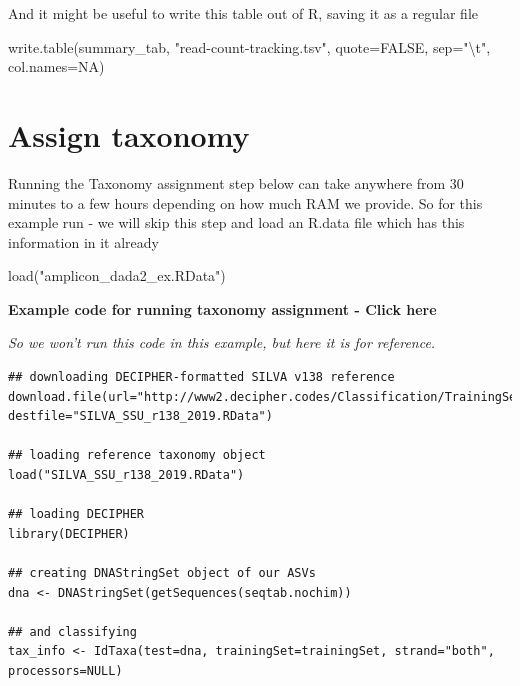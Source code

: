 \documentclass[
]{book}
\makeatletter
\newenvironment{Shaded}{\begin{snugshade}}{\end{snugshade}}
\newcommand{\AttributeTok}[1]{\textcolor[rgb]{0.77,0.63,0.00}{#1}}
\newcommand{\ConstantTok}[1]{\textcolor[rgb]{0.00,0.00,0.00}{#1}}
\newcommand{\FunctionTok}[1]{\textcolor[rgb]{0.00,0.00,0.00}{#1}}
\newcommand{\NormalTok}[1]{#1}
\newcommand{\SpecialCharTok}[1]{\textcolor[rgb]{0.00,0.00,0.00}{#1}}
\newcommand{\StringTok}[1]{\textcolor[rgb]{0.31,0.60,0.02}{#1}}
\newenvironment{kframe}{%
\medskip{}
\setlength{\fboxsep}{.8em}
 \def\at@end@of@kframe{}%
 \ifinner\ifhmode%
  \def\at@end@of@kframe{\end{minipage}}%
  \begin{minipage}{\columnwidth}%
 \fi\fi%
 \def\FrameCommand##1{\hskip\@totalleftmargin \hskip-\fboxsep
 \colorbox{shadecolor}{##1}\hskip-\fboxsep
     \hskip-\linewidth \hskip-\@totalleftmargin \hskip\columnwidth}%
 \MakeFramed {\advance\hsize-\width
   \@totalleftmargin\z@ \linewidth\hsize
   \@setminipage}}%
 {\par\unskip\endMakeFramed%
 \at@end@of@kframe}
\newenvironment{block}[1]
  {
  \begin{itemize}
  \renewcommand{\labelitemi}{
    \raisebox{-.7\height}[0pt][0pt]{
      {\setkeys{Gin}{width=3em,keepaspectratio}\texttt{[image: images/\#1]}}
    }
  }
  \setlength{\fboxsep}{1em}
  \begin{kframe}
  \item
  }
  {
  \end{kframe}
  \end{itemize}
  }
\newenvironment{rmdwarning}
  {\begin{block}{warning}}
  {\end{block}}
\makeatother
\begin{document}
And it might be useful to write this table out of R, saving it as a regular file

\begin{Shaded}
\begin{Highlighting}[]
\FunctionTok{write.table}\NormalTok{(summary\_tab, }\StringTok{"read{-}count{-}tracking.tsv"}\NormalTok{, }\AttributeTok{quote=}\ConstantTok{FALSE}\NormalTok{, }\AttributeTok{sep=}\StringTok{"}\SpecialCharTok{\textbackslash{}t}\StringTok{"}\NormalTok{, }\AttributeTok{col.names=}\ConstantTok{NA}\NormalTok{)}
\end{Highlighting}
\end{Shaded}

\hypertarget{assign-taxonomy}{%
\section{Assign taxonomy}\label{assign-taxonomy}}

\begin{rmdwarning}
Running the Taxonomy assignment step below can take anywhere from 30
minutes to a few hours depending on how much RAM we provide. So for this
example run - we will skip this step and load an R.data file which has
this information in it already
\end{rmdwarning}

\begin{Shaded}
\begin{Highlighting}[]
\FunctionTok{load}\NormalTok{(}\StringTok{"amplicon\_dada2\_ex.RData"}\NormalTok{)}
\end{Highlighting}
\end{Shaded}

\textbf{Example code for running taxonomy assignment - Click here}

\emph{So we won't run this code in this example, but here it is for reference.}

\begin{verbatim}
## downloading DECIPHER-formatted SILVA v138 reference
download.file(url="http://www2.decipher.codes/Classification/TrainingSets/SILVA_SSU_r138_2019.RData", destfile="SILVA_SSU_r138_2019.RData")

## loading reference taxonomy object
load("SILVA_SSU_r138_2019.RData")

## loading DECIPHER
library(DECIPHER)

## creating DNAStringSet object of our ASVs
dna <- DNAStringSet(getSequences(seqtab.nochim))

## and classifying
tax_info <- IdTaxa(test=dna, trainingSet=trainingSet, strand="both", processors=NULL)
\end{verbatim}
\end{document}
